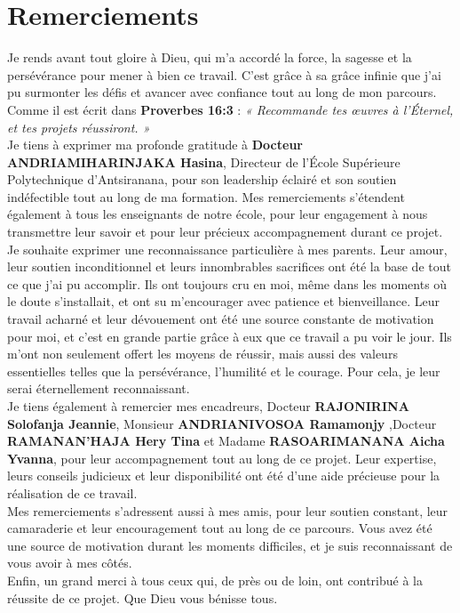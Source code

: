 \chapter*{Remerciements}
{}

Je rends avant tout gloire à Dieu, qui m’a accordé la force, la sagesse et la persévérance pour mener à bien ce travail. C'est grâce à sa grâce infinie que j'ai pu surmonter les défis et avancer avec confiance tout au long de mon parcours. Comme il est écrit dans \textbf{Proverbes 16:3} : \textit{« Recommande tes œuvres à l’Éternel, et tes projets réussiront. »}\\


Je tiens à exprimer ma profonde gratitude à \textbf{Docteur ANDRIAMIHARINJAKA Hasina}, Directeur de l’École Supérieure Polytechnique d’Antsiranana, pour son leadership éclairé et son soutien indéfectible tout au long de ma formation. Mes remerciements s'étendent également à tous les enseignants de notre école, pour leur engagement à nous transmettre leur savoir et pour leur précieux accompagnement durant ce projet.\\

Je souhaite exprimer une reconnaissance particulière à mes parents. Leur amour, leur soutien inconditionnel et leurs innombrables sacrifices ont été la base de tout ce que j'ai pu accomplir. Ils ont toujours cru en moi, même dans les moments où le doute s'installait, et ont su m'encourager avec patience et bienveillance. Leur travail acharné et leur dévouement ont été une source constante de motivation pour moi, et c'est en grande partie grâce à eux que ce travail a pu voir le jour. Ils m'ont non seulement offert les moyens de réussir, mais aussi des valeurs essentielles telles que la persévérance, l'humilité et le courage. Pour cela, je leur serai éternellement reconnaissant.\\

Je tiens également à remercier mes encadreurs, Docteur \textbf{ RAJONIRINA Solofanja Jeannie}, Monsieur \textbf{ ANDRIANIVOSOA Ramamonjy} ,Docteur  \textbf{RAMANAN'HAJA Hery Tina} et Madame \textbf{  RASOARIMANANA Aicha Yvanna}, pour leur accompagnement tout au long de ce projet. Leur expertise, leurs conseils judicieux et leur disponibilité ont été d'une aide précieuse pour la réalisation de ce travail.\\

Mes remerciements s'adressent aussi à mes amis, pour leur soutien constant, leur camaraderie et leur encouragement tout au long de ce parcours. Vous avez été une source de motivation durant les moments difficiles, et je suis reconnaissant de vous avoir à mes côtés.\\

Enfin, un grand merci à tous ceux qui, de près ou de loin, ont contribué à la réussite de ce projet. Que Dieu vous bénisse tous.\\

